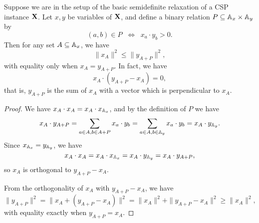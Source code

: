 \documentclass[letterpaper,11pt]{article}
\begin{document}
\begin{lem}\label{sdp-weak-prague} Suppose we are in the setup of the basic semidefinite relaxation of a CSP instance $\mathbf{X}$. Let $x,y$ be variables of $\mathbf{X}$, and define a binary relation $P \subseteq \mathbb{A}_x \times \mathbb{A}_y$ by
\[
(a,b) \in P \;\; \iff \;\; x_a \cdot y_b > 0.
\]
Then for any set $A \subseteq \mathbb{A}_x$, we have
\[
\|x_A\|^2 \le \|y_{A+P}\|^2,
\]
with equality only when $x_A = y_{A+P}$. In fact, we have
\[
x_A \cdot (y_{A+P} - x_A) = 0,
\]
that is, $y_{A+P}$ is the sum of $x_A$ with a vector which is perpendicular to $x_A$.
\end{lem}
\begin{proof} We have $x_A\cdot x_A = x_A \cdot x_{\mathbb{A}_x}$, and by the definition of $P$ we have
\[
x_A \cdot y_{A+P} = \sum_{a\in A, b \in A+P} x_a \cdot y_b = \sum_{a\in A, b \in \mathbb{A}_y} x_a \cdot y_b = x_A \cdot y_{\mathbb{A}_y}.
\]
Since $x_{\mathbb{A}_x} = y_{\mathbb{A}_y}$, we have
\[
x_A \cdot x_A = x_A \cdot x_{\mathbb{A}_x} = x_A \cdot y_{\mathbb{A}_y} = x_A \cdot y_{A+P},
\]
so $x_A$ is orthogonal to $y_{A+P} - x_A$.

From the orthogonality of $x_A$ with $y_{A+P} - x_A$, we have
\[
\|y_{A+P}\|^2 = \|x_A + (y_{A+P} - x_A)\|^2 = \|x_A\|^2 + \|y_{A+P} - x_A\|^2 \ge \|x_A\|^2,
\]
with equality exactly when $y_{A+P} = x_A$.
\end{proof}
\end{document}
